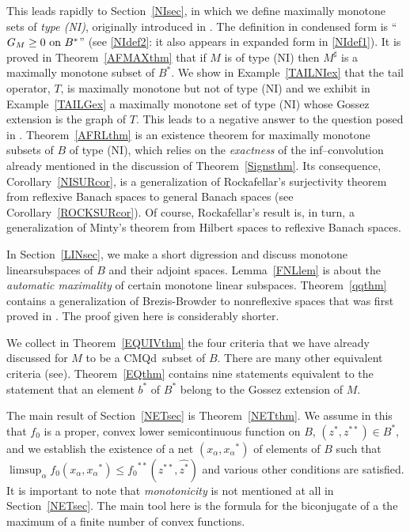 \documentclass[letterpaper]{article}
\theoremstyle{plain}
\theoremstyle{definition}
\numberwithin{equation}{section}
\newcommand{\cmqd}{{CMQd}}
\newcommand{\dbs}{^{**}}
\newcommand{\limsupn}{\limsup\nolimits}
\newcommand{\on}{\hbox{on}}
\newcommand{\wh}{\widehat}
\newcommand{\Cor}{Corollary~\ref}
\newcommand{\Ex}{Example~\ref}
\newcommand{\Lem}{Lemma~\ref}
\newcommand{\Sec}{Section~\ref}
\newcommand{\Thm}{Theorem~\ref}
\begin{document}
This leads rapidly to \Sec{NIsec}, in which we define maximally monotone sets of {\em type (NI)}, originally introduced in \cite[1996]{RANGE}. The definition in condensed form is  ``$G_M \ge 0\ \on\ B^*$'' \big(see \eqref{NIdef2}: it also appears in expanded form in \eqref{NIdef1}\big).    It is proved in \Thm{AFMAXthm} that if $M$ is of type (NI) then $M^\sharp$ is a maximally monotone subset of $B^*$.  We show in \Ex{TAILNIex} that the tail operator, $T$, is maximally monotone but not of type (NI) and we exhibit in \Ex{TAILGex} a maximally monotone set of type (NI) whose Gossez extension is the graph of $T$. This leads to a negative answer to the question posed in \cite[Problem 12.7, p.\ 1047]{PARTONE}.
   \Thm{AFRLthm} is an existence theorem for maximally monotone subsets of $B$ of type (NI), which relies on the {\em exactness} of the inf--convolution already mentioned in the discussion of \Thm{Signsthm}.  Its consequence, \Cor{NISURcor}, is a generalization of Rockafellar's surjectivity theorem from reflexive Banach spaces to general Banach spaces (see \Cor{ROCKSURcor}).   Of course, Rockafellar's result is, in turn, a generalization of Minty's theorem from Hilbert spaces to reflexive Banach spaces.              

In \Sec{LINsec}, we make a short digression and discuss monotone linear\break subspaces of $B$ and their adjoint spaces.  \Lem{FNLlem} is about the {\em automatic maximality} of certain monotone linear subspaces.  \Thm{qqthm} contains a generalization of Brezis-Browder \cite[Theorem 2]{BB} to nonreflexive spaces that was first proved in \cite[Theorem 4.1, p.\ 4960]{BBWYBB}.   The proof given here is considerably shorter.


We collect in \Thm{EQUIVthm} the four criteria that we have already discussed for $M$ to be a \cmqd\ subset of $B$.   There are many other equivalent criteria  \big(see\break \cite[Introduction, pp.\ 6--7]{PARTTWO}\big).   \Thm{EQthm} contains nine statements equivalent to the statement that an element $b^*$ of $B^*$ belong to the Gossez extension of $M$.

The main result of \Sec{NETsec} is \Thm{NETthm}.   We assume in this that $f_0$ is a proper, convex lower semicontinuous function on $B$, $(z^*,z\dbs) \in B^*$, and we establish the existence of a net $(x_\alpha,{x_\alpha}^*)$ of elements of $B$ such that $\limsupn_\alpha f_0(x_\alpha,{x_\alpha}^*) \le {f_0}\dbs(z\dbs,\wh{z^*})$ and various other conditions are satisfied.   It is important to note that {\em monotonicity} is not mentioned at all in \Sec{NETsec}.  The main tool here is the formula for the biconjugate of a the maximum of a finite number of convex functions. 
\end{document}
